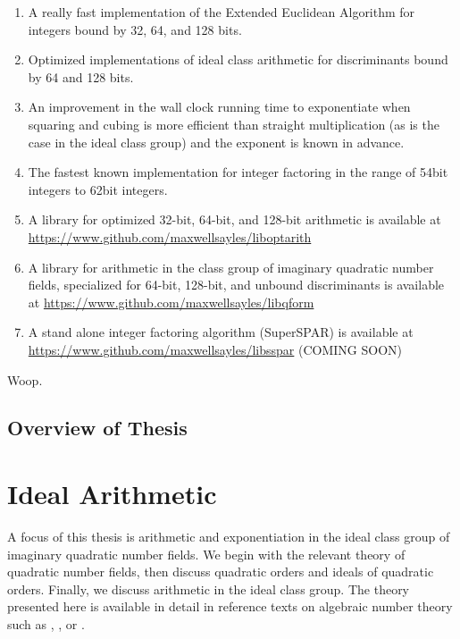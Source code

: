 \documentclass{ucalgthes1}
\theoremstyle{definition}
\begin{document}
\begin{enumerate}
\item A really fast implementation of the Extended Euclidean Algorithm for integers bound by 32, 64, and 128 bits.

\item Optimized implementations of ideal class arithmetic for discriminants bound by 64 and 128 bits.

\item An improvement in the wall clock running time to exponentiate when squaring and cubing is more efficient than straight multiplication (as is the case in the ideal class group) and the exponent is known in advance.

\item The fastest known implementation for integer factoring in the range of 54bit integers to 62bit integers.

\item A library for optimized 32-bit, 64-bit, and 128-bit arithmetic is available at \url{https://www.github.com/maxwellsayles/liboptarith}

\item A library for arithmetic in the class group of imaginary quadratic number fields, specialized for 64-bit, 128-bit, and unbound discriminants is available at \url{https://www.github.com/maxwellsayles/libqform}

\item A stand alone integer factoring algorithm (SuperSPAR) is available at \url{https://www.github.com/maxwellsayles/libsspar}  (COMING SOON)

\end{enumerate}

Woop.

\section{Overview of Thesis}



\chapter{Ideal Arithmetic}
\label{chap:idealArithmetic}

A focus of this thesis is arithmetic and exponentiation in the ideal class group of imaginary quadratic number fields.  We begin with the relevant theory of quadratic number fields, then discuss quadratic orders and ideals of quadratic orders.  Finally, we discuss arithmetic in the ideal class group.  The theory presented here is available in detail in reference texts on algebraic number theory such as \cite{Cohn1980}, \cite{Hua2012}, or \cite{Ireland1990}. 
\end{document}
